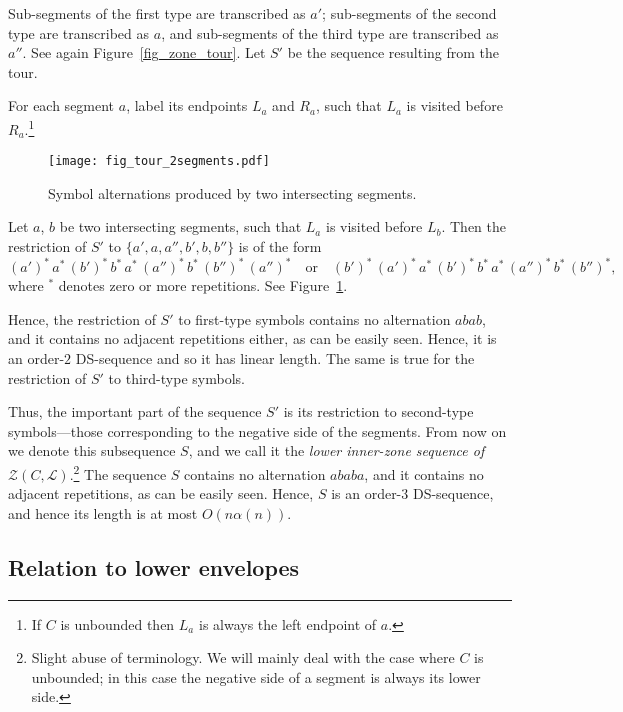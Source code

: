 \documentclass[11pt]{article}
\theoremstyle{definition}
\theoremstyle{remark}
\begin{document}
Sub-segments of the first type are transcribed as $a'$; sub-segments of the second type are transcribed as $a$, and sub-segments of the third type are transcribed as $a''$. See again Figure~\ref{fig_zone_tour}. Let $S'$ be the sequence resulting from the tour.

For each segment $a$, label its endpoints $L_a$ and $R_a$, such that $L_a$ is visited before $R_a$.\footnote{If $C$ is unbounded then $L_a$ is always the left endpoint of $a$.}

\begin{figure}
\centerline{\texttt{[image: fig\_tour\_2segments.pdf]}}
\caption{\label{fig_tour_2segments}Symbol alternations produced by two intersecting segments.}
\end{figure}

Let $a$, $b$ be two intersecting segments, such that $L_a$ is visited before $L_b$. Then the restriction of $S'$ to $\{a',a,a'',b',b,b''\}$ is of the form
\begin{equation*}
(a')^*\, a^*\, (b')^*\, b^*\, a^*\, (a'')^*\, b^*\, (b'')^*\, (a'')^* \quad \text{or}\quad (b')^*\, (a')^*\, a^*\, (b')^*\, b^*\, a^*\, (a'')^*\, b^*\, (b'')^*,
\end{equation*}
where ${}^*$ denotes zero or more repetitions. See Figure~\ref{fig_tour_2segments}.

Hence, the restriction of $S'$ to first-type symbols contains no alternation $abab$, and it contains no adjacent repetitions either, as can be easily seen. Hence, it is an order-$2$ DS-sequence and so it has linear length. The same is true for the restriction of $S'$ to third-type symbols.

Thus, the important part of the sequence $S'$ is its restriction to second-type symbols---those corresponding to the negative side of the segments. From now on we denote this subsequence $S$, and we call it the \emph{lower inner-zone sequence of $\mathcal Z(C, \mathcal L)$}.\footnote{Slight abuse of terminology. We will mainly deal with the case where $C$ is unbounded; in this case the negative side of a segment is always its lower side.} The sequence $S$ contains no alternation $ababa$, and it contains no adjacent repetitions, as can be easily seen. Hence, $S$ is an order-$3$ DS-sequence, and hence its length is at most $O(n\alpha(n))$.

\subsection{Relation to lower envelopes}
\end{document}
